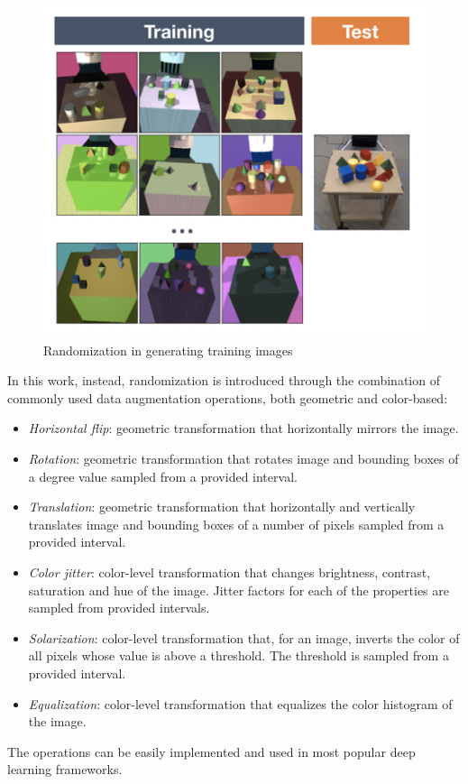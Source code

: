 \documentclass[%
    corpo=12pt,
    twoside,
    stile=classica,   
    tipotesi=magistrale,
    evenboxes,
    english,
	numerazioneromana,
]{toptesi}
\begin{document}
\begin{figure}[ht!]
	\centering
	\includegraphics[width=0.8\linewidth]{imgs/randomization.png}
	\caption{Randomization in generating training images\cite{tobin2017domain}}
	\label{fig:randomization}
\end{figure}

In this work, instead, randomization is introduced through the combination of commonly used data augmentation operations, both geometric and color-based:
\begin{itemize}
	\item \textit{Horizontal flip}: geometric transformation that horizontally mirrors the image.
	\item \textit{Rotation}: geometric transformation that rotates image and bounding boxes of a degree value sampled from a provided interval.
	\item \textit{Translation}: geometric transformation that horizontally and vertically translates image and bounding boxes of a number of pixels sampled from a provided interval.
	\item \textit{Color jitter}: color-level transformation that changes brightness, contrast, saturation and hue of the image. Jitter factors for each of the properties are sampled from provided intervals.
	\item \textit{Solarization}: color-level transformation that, for an image, inverts the color of all pixels whose value is above a threshold. The threshold is sampled from a provided interval.
	\item \textit{Equalization}: color-level transformation that equalizes the color histogram of the image.
\end{itemize}
The operations can be easily implemented and used in most popular deep learning frameworks.
\end{document}
